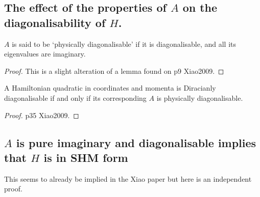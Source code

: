 \subsection{The effect of the properties of $A$ on the diagonalisability of $H$.}
\begin{definition}
$A$ is said to be `physically diagonalisable' if it is diagonalisable, and all its eigenvalues are imaginary.
\end{definition}
\begin{proof}
This is a slight alteration of a lemma found on p9 Xiao2009.
\end{proof}

\begin{lemma}
A Hamiltonian quadratic in coordinates and momenta is Diracianly diagonalisable if and only if its corresponding $A$ is physically diagonalisable. \label{lem:dirdiag}
\end{lemma}
\begin{proof}
p35 Xiao2009.
\end{proof}

\subsection{$A$ is pure imaginary and diagonalisable implies that $H$ is in SHM form}
This seems to already be implied in the Xiao paper but here is an independent proof.

